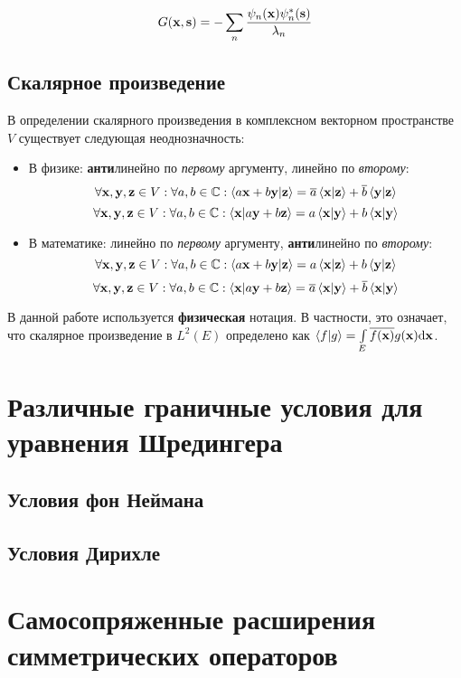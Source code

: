 \[
G(\vb{x}, \vb{s}) = -\sum\limits_n \frac{\psi_n(\vb{x}) \psi_n^*(\vb{s})}{\lambda_n}
\]

\subsection{Скалярное произведение}
В определении скалярного произведения в комплексном векторном пространстве $V$ существует следующая неоднозначность:

\begin{itemize}
\item В физике: \textbf{анти}линейно по \textit{первому} аргументу, линейно по \textit{второму}:
\[
\forall \vb{x}, \vb{y}, \vb{z} \in V: \forall a, b \in \mathbb{C}: \ip{a\vb{x} + b\vb{y}}{\vb{z}} = \cconj{a} \ip{\vb{x}}{\vb{z}} + \cconj{b} \ip{\vb{y}}{\vb{z}}
\]
\[
\forall \vb{x}, \vb{y}, \vb{z} \in V: \forall a, b \in \mathbb{C}: \ip{\vb{x}}{a\vb{y} + b\vb{z}} = a \ip{\vb{x}}{\vb{y}} + b \ip{\vb{x}}{\vb{y}}
\]
\item В математике: линейно по \textit{первому} аргументу, \textbf{анти}линейно по \textit{второму}:
\[
\forall \vb{x}, \vb{y}, \vb{z} \in V: \forall a, b \in \mathbb{C}: \ip{a\vb{x} + b\vb{y}}{\vb{z}} = a \ip{\vb{x}}{\vb{z}} + b \ip{\vb{y}}{\vb{z}}
\]
\[
\forall \vb{x}, \vb{y}, \vb{z} \in V: \forall a, b \in \mathbb{C}: \ip{\vb{x}}{a\vb{y} + b\vb{z}} = \cconj{a} \ip{\vb{x}}{\vb{y}} + \cconj{b} \ip{\vb{x}}{\vb{y}}
\]
\end{itemize}

В данной работе используется \textbf{физическая} нотация. В частности, это означает, что скалярное произведение в $L^2(E)$ определено как $\ip{f}{g} = \int\limits_E \cconj{f(\vb{x})} g(\vb{x}) \dd \vb{x}$.

\section{Различные граничные условия для уравнения Шредингера}
\subsection{Условия фон Неймана}
\subsection{Условия Дирихле}

\section{Самосопряженные расширения симметрических операторов}

